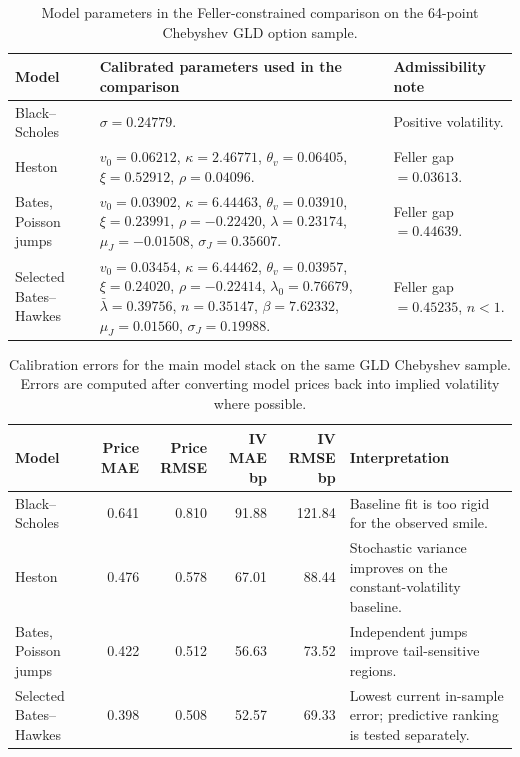 \documentclass[a4paper,10pt,titlepage,oneside,openany]{book}
\theoremstyle{plain}
\theoremstyle{definition}
\theoremstyle{remark}
\begin{document}
\begin{table}[H]
\centering
\scriptsize
\setlength{\tabcolsep}{2.8pt}
\begin{tabularx}{\textwidth}{@{}>{\RaggedRight\arraybackslash}p{2.4cm}>{\RaggedRight\arraybackslash}X>{\RaggedRight\arraybackslash}p{2.8cm}@{}}
\toprule
\textbf{Model} & \textbf{Calibrated parameters used in the comparison} & \textbf{Admissibility note} \\
\midrule
Black--Scholes & \(\sigma=0.24779\). & Positive volatility. \\
Heston & \(v_0=0.06212\), \(\kappa=2.46771\), \(\theta_v=0.06405\), \(\xi=0.52912\), \(\rho=0.04096\). & Feller gap \(=0.03613\). \\
Bates, Poisson jumps & \(v_0=0.03902\), \(\kappa=6.44463\), \(\theta_v=0.03910\), \(\xi=0.23991\), \(\rho=-0.22420\), \(\lambda=0.23174\), \(\mu_J=-0.01508\), \(\sigma_J=0.35607\). & Feller gap \(=0.44639\). \\
Selected Bates--Hawkes & \(v_0=0.03454\), \(\kappa=6.44462\), \(\theta_v=0.03957\), \(\xi=0.24020\), \(\rho=-0.22414\), \(\lambda_0=0.76679\), \(\bar{\lambda}=0.39756\), \(n=0.35147\), \(\beta=7.62332\), \(\mu_J=0.01560\), \(\sigma_J=0.19988\). & Feller gap \(=0.45235\), \(n<1\). \\
\bottomrule
\end{tabularx}
\caption{Model parameters in the Feller-constrained comparison on the 64-point Chebyshev GLD option sample.}
\label{tab:model-parameters}
\end{table}

\begin{table}[H]
\centering
\scriptsize
\setlength{\tabcolsep}{3.2pt}
\begin{tabularx}{\textwidth}{@{}>{\RaggedRight\arraybackslash}p{2.4cm}rrrr>{\RaggedRight\arraybackslash}X@{}}
\toprule
\textbf{Model} & \textbf{Price MAE} & \textbf{Price RMSE} & \textbf{IV MAE bp} & \textbf{IV RMSE bp} & \textbf{Interpretation} \\
\midrule
Black--Scholes & 0.641 & 0.810 & 91.88 & 121.84 & Baseline fit is too rigid for the observed smile. \\
Heston & 0.476 & 0.578 & 67.01 & 88.44 & Stochastic variance improves on the constant-volatility baseline. \\
Bates, Poisson jumps & 0.422 & 0.512 & 56.63 & 73.52 & Independent jumps improve tail-sensitive regions. \\
Selected Bates--Hawkes & 0.398 & 0.508 & 52.57 & 69.33 & Lowest current in-sample error; predictive ranking is tested separately. \\
\bottomrule
\end{tabularx}
\caption{Calibration errors for the main model stack on the same GLD Chebyshev sample. Errors are computed after converting model prices back into implied volatility where possible.}
\label{tab:model-errors}
\end{table}
\end{document}
